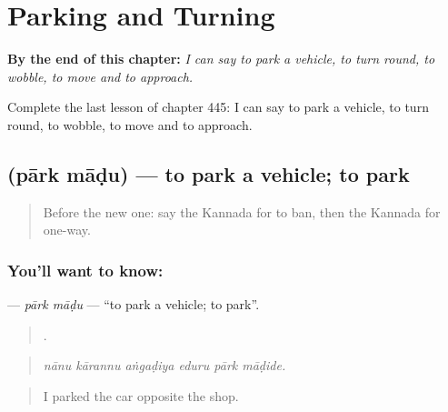 
\chapter{Parking and Turning}
\label{ch:ka-parking-and-turning}

\begin{chapteropening}
\textbf{By the end of this chapter:} \emph{I can say to park a vehicle, to turn round, to wobble, to move and to approach.}

Complete the last lesson of chapter 445: I can say to park a vehicle, to turn round, to wobble, to move and to approach.
\end{chapteropening}

\section[\texorpdfstring{\kn{ಪಾರ್ಕ್} \kn{ಮಾಡು} (pārk māḍu)}{ಪಾರ್ಕ್ ಮಾಡು (pārk māḍu)}]{  (pārk māḍu) — to park a vehicle; to park}

\label{lesson:KA-C445-park-madu}



\begin{quote}
Before the new one: say the Kannada for to ban, then the Kannada for one-way.
\end{quote}

\subsection*{You'll want to know:  }
\textbf{ } — \emph{pārk māḍu} — \textquotedblleft{}to park a vehicle; to park\textquotedblright{}.

\begin{quote}
     .
\end{quote}

\begin{quote}
\emph{nānu kārannu aṅgaḍiya eduru pārk māḍide.}
\end{quote}

\begin{quote}
I parked the car opposite the shop.
\end{quote}

